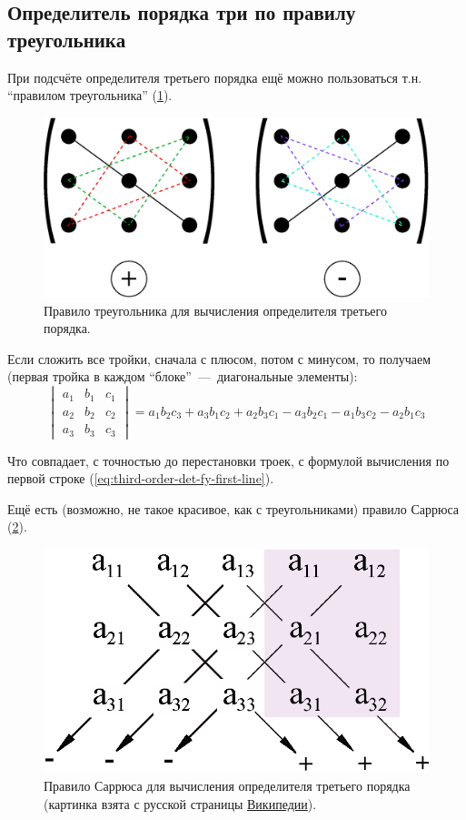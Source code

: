 \documentclass[a4paper,12pt]{article}
\begin{document}
  
  \subsection{Определитель порядка три по правилу треугольника}
  
  При подсчёте определителя третьего порядка ещё можно пользоваться т.н. ``правилом треугольника'' (\ref{fig:triangle-rule}).
  
  \begin{figure}[h]
    \centering
    
    \includegraphics[width=0.6\columnwidth]{triangle-rule}
    
    \caption{Правило треугольника для вычисления определителя третьего порядка.}
    \label{fig:triangle-rule}
  \end{figure}
  
  Если сложить все тройки, сначала с плюсом, потом с минусом, то получаем (первая тройка в каждом ``блоке''~---~диагональные элементы):
  \begin{equation*}
    \begin{vmatrix}
      a_1 & b_1 & c_1\\
      a_2 & b_2 & c_2\\
      a_3 & b_3 & c_3
    \end{vmatrix}
      = a_1 b_2 c_3 + a_3 b_1 c_2 + a_2 b_3 c_1 - a_3 b_2 c_1 - a_1 b_3 c_2 - a_2 b_1 c_3
  \end{equation*}
  
  Что совпадает, с точностью до перестановки троек, с формулой вычисления по первой строке (\ref{eq:third-order-det-fy-first-line}).
  
  Ещё есть (возможно, не такое красивое, как с треугольниками) правило Саррюса (\ref{fig:determinant-sarrus}).
  
  \begin{figure}[h]
    \centering
    
    \includegraphics[width=0.4\columnwidth]{determinant-sarrus}
    
    \caption{Правило Саррюса для вычисления определителя третьего порядка (картинка взята с русской страницы \href{https://upload.wikimedia.org/wikipedia/commons/1/17/Determinant-sarrus.svg}{Википедии}).}
    \label{fig:determinant-sarrus}
  \end{figure}
  
\end{document}
